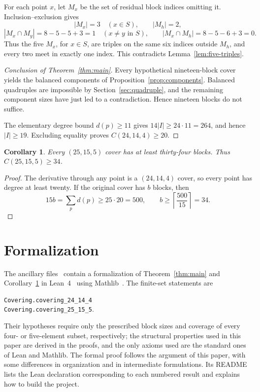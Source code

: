 \documentclass[11pt,letterpaper]{article}
\newtheorem{corollary}[theorem]{Corollary}
\theoremstyle{definition}\newtheorem{definition}[theorem]{Definition}
\theoremstyle{remark}\newtheorem{remark}[theorem]{Remark}
\newcommand{\code}[1]{{\small\nolinkurl{#1}}}
\begin{document}
For each point $x$, let $M_x$ be the set of residual block indices omitting it. Inclusion--exclusion gives
\[
 |M_x|=3\quad(x\in S),\qquad |M_h|=2,
\]
\[
 |M_x\cap M_y|=8-5-5+3=1\quad(x\ne y\text{ in }S),
 \qquad |M_x\cap M_h|=8-5-6+3=0.
\]
Thus the five $M_x$, for $x\in S$, are triples on the same six indices outside $M_h$, and every two meet in exactly one index. This contradicts Lemma~\ref{lem:five-triples}.

\begin{proof}[Conclusion of Theorem~\ref{thm:main}]
Every hypothetical nineteen-block cover yields the balanced components of Proposition~\ref{prop:components}. Balanced quadruples are impossible by Section~\ref{sec:quadruple}, and the remaining component sizes have just led to a contradiction. Hence nineteen blocks do not suffice.

The elementary degree bound $d(p)\ge11$ gives $14|I|\ge24\cdot11=264$, and hence $|I|\ge19$. Excluding equality proves $C(24,14,4)\ge20$.
\end{proof}

\begin{corollary}\label{cor:25}
Every $(25,15,5)$ cover has at least thirty-four blocks. Thus $C(25,15,5)\ge34$.
\end{corollary}
\begin{proof}
The derivative through any point is a $(24,14,4)$ cover, so every point has degree at least twenty. If the original cover has $b$ blocks, then
\[
 15b=\sum_p d(p)\ge25\cdot20=500,
 \qquad b\ge\left\lceil\frac{500}{15}\right\rceil=34.
\]
\end{proof}

\section{Formalization}\label{sec:formalization}
The ancillary files~\cite{Formalization} contain a formalization of Theorem~\ref{thm:main} and Corollary~\ref{cor:25} in Lean~4~\cite{Lean4} using Mathlib~\cite{Mathlib}. The finite-set statements are
\begin{center}
\code{Covering.covering_24_14_4}\\
\code{Covering.covering_25_15_5}.
\end{center}
Their hypotheses require only the prescribed block sizes and coverage of every four- or five-element subset, respectively; the structural properties used in this paper are derived in the proofs, and the only axioms used are the standard ones of Lean and Mathlib. The formal proof follows the argument of this paper, with some differences in organization and in intermediate formulations. Its README lists the Lean declaration corresponding to each numbered result and explains how to build the project.
\end{document}
